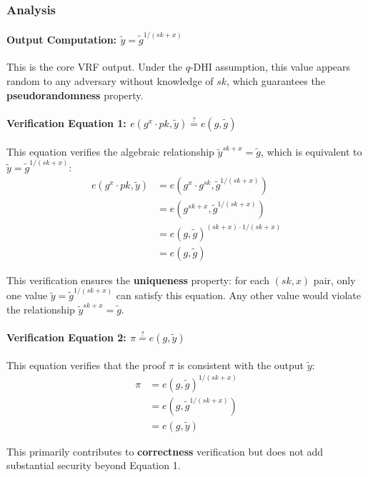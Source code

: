 \subsubsection{Analysis}

\paragraph{Output Computation: $\tilde{y} = \tilde{g}^{1/(sk + x)}$}
This is the core VRF output. Under the $q$-DHI assumption, this value appears random to any adversary without knowledge of $sk$, which guarantees the \textbf{pseudorandomness} property.

\paragraph{Verification Equation 1: $e(g^{x} \cdot pk, \tilde{y}) \stackrel{?}{=} e(g, \tilde{g})$}
This equation verifies the algebraic relationship $\tilde{y}^{sk+x} = \tilde{g}$, which is equivalent to $\tilde{y} = \tilde{g}^{1/(sk+x)}$:
\begin{align*}
    e(g^{x} \cdot pk, \tilde{y}) &= e(g^{x} \cdot g^{sk}, \tilde{g}^{1/(sk + x)}) \\
    &= e(g^{sk + x}, \tilde{g}^{1/(sk + x)}) \\
    &= e(g, \tilde{g})^{(sk + x) \cdot 1/(sk + x)} \\
    &= e(g, \tilde{g})
\end{align*}

This verification ensures the \textbf{uniqueness} property: for each $(sk,x)$ pair, only one value $\tilde{y} = \tilde{g}^{1/(sk+x)}$ can satisfy this equation. Any other value would violate the relationship $\tilde{y}^{sk+x} = \tilde{g}$.

\paragraph{Verification Equation 2: $\pi \stackrel{?}{=} e(g, \tilde{y})$}
This equation verifies that the proof $\pi$ is consistent with the output $\tilde{y}$:
\begin{align*}
    \pi &= e(g, \tilde{g})^{1/(sk + x)} \\
    &= e(g, \tilde{g}^{1/(sk + x)}) \\
    &= e(g, \tilde{y})
\end{align*}

This primarily contributes to \textbf{correctness} verification but does not add substantial security beyond Equation 1.

